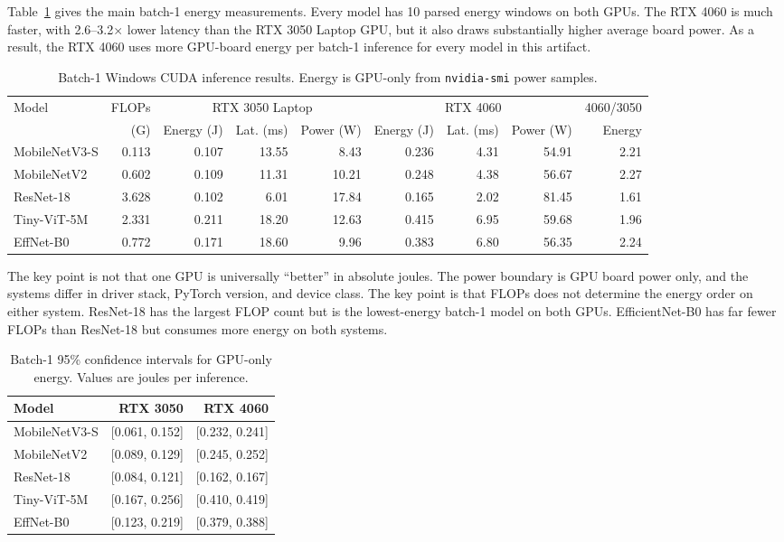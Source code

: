 \documentclass[conference]{IEEEtran}
\begin{document}
Table~\ref{tab:batch1} gives the main batch-1 energy measurements. Every model
has 10 parsed energy windows on both GPUs. The RTX 4060 is much faster, with
2.6--3.2$\times$ lower latency than the RTX 3050 Laptop GPU, but it also draws
substantially higher average board power. As a result, the RTX 4060 uses more
GPU-board energy per batch-1 inference for every model in this artifact.

\begin{table}[t]
\centering
\caption{Batch-1 Windows CUDA inference results. Energy is GPU-only from
\texttt{nvidia-smi} power samples.}
\label{tab:batch1}
\scriptsize
\begin{tabular}{@{}lrrrrrrrr@{}}
\toprule
Model & FLOPs & \multicolumn{3}{c}{RTX 3050 Laptop} &
\multicolumn{3}{c}{RTX 4060} & 4060/3050\\
\cmidrule(lr){3-5}\cmidrule(lr){6-8}
 & (G) & Energy (J) & Lat. (ms) & Power (W) &
 Energy (J) & Lat. (ms) & Power (W) & Energy\\
\midrule
MobileNetV3-S & 0.113 & 0.107 & 13.55 & 8.43 & 0.236 & 4.31 & 54.91 & 2.21\\
MobileNetV2 & 0.602 & 0.109 & 11.31 & 10.21 & 0.248 & 4.38 & 56.67 & 2.27\\
ResNet-18 & 3.628 & 0.102 & 6.01 & 17.84 & 0.165 & 2.02 & 81.45 & 1.61\\
Tiny-ViT-5M & 2.331 & 0.211 & 18.20 & 12.63 & 0.415 & 6.95 & 59.68 & 1.96\\
EffNet-B0 & 0.772 & 0.171 & 18.60 & 9.96 & 0.383 & 6.80 & 56.35 & 2.24\\
\bottomrule
\end{tabular}
\end{table}

The key point is not that one GPU is universally ``better'' in absolute
joules. The power boundary is GPU board power only, and the systems differ in
driver stack, PyTorch version, and device class. The key point is that FLOPs
does not determine the energy order on either system. ResNet-18 has the
largest FLOP count but is the lowest-energy batch-1 model on both GPUs.
EfficientNet-B0 has far fewer FLOPs than ResNet-18 but consumes more energy on
both systems.

\begin{table}[t]
\centering
\caption{Batch-1 95\% confidence intervals for GPU-only energy. Values are
joules per inference.}
\label{tab:ci}
\scriptsize
\begin{tabular}{@{}lrr@{}}
\toprule
Model & RTX 3050 & RTX 4060\\
\midrule
MobileNetV3-S & [0.061, 0.152] & [0.232, 0.241]\\
MobileNetV2 & [0.089, 0.129] & [0.245, 0.252]\\
ResNet-18 & [0.084, 0.121] & [0.162, 0.167]\\
Tiny-ViT-5M & [0.167, 0.256] & [0.410, 0.419]\\
EffNet-B0 & [0.123, 0.219] & [0.379, 0.388]\\
\bottomrule
\end{tabular}
\end{table}
\end{document}
